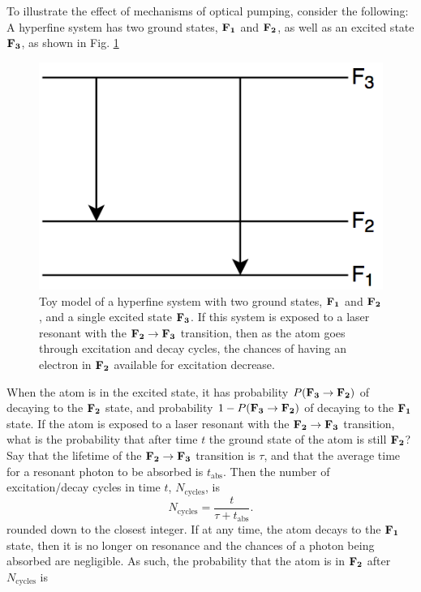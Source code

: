 To illustrate the effect of mechanisms of optical pumping, consider the following: A hyperfine system has two ground states, $\bf{F}_1$ and $\bf{F}_2$, as well as an excited state $\bf{F}_3$, as shown in Fig. \ref{toy_model}
\begin{figure}[h]
\begin{center}
\includegraphics[width=\textwidth]{Graphics/Toy_model.png}
\small
\caption{Toy model of a hyperfine system with two ground states, $\bf{F}_1$ and $\bf{F}_2$, and a single excited state $\bf{F}_3$. If this system is exposed to a laser resonant with the $\bf{F}_2 \rightarrow \bf{F}_3$ transition, then as the atom goes through excitation and decay cycles, the chances of having an electron in $\bf{F}_2$ available for excitation decrease.}
\end{center}
\label{toy_model}
\end{figure}
When the atom is in the excited state, it has probability $P(\bf{F}_3 \rightarrow \bf{F}_2)$ of decaying to the $\bf{F}_2$ state, and probability $1-P(\bf{F}_3 \rightarrow \bf{F}_2)$ of decaying to the $\bf{F}_1$ state. If the atom is exposed to a laser resonant with the $\bf{F}_2 \rightarrow \bf{F}_3$ transition, what is the probability that after time $t$ the ground state of the atom is still $\bf{F}_2$? Say that the lifetime of the $\bf{F}_2 \rightarrow \bf{F}_3$ transition is $\tau$, and that the average time for a resonant photon to be absorbed is $t_{\mathrm{abs}}$. Then the number of excitation/decay cycles in time $t$, $N_{\mathrm{cycles}}$, is
\begin{equation}
N_{\mathrm{cycles}}=\frac{t}{\tau+t_{\mathrm{abs}}}.
\end{equation}
rounded down to the closest integer. If at any time, the atom decays to the $\bf{F}_1$ state, then it is no longer on resonance and the chances of a photon being absorbed are negligible. As such, the probability that the atom is in $\bf{F}_2$ after $N_{\mathrm{cycles}}$ is

